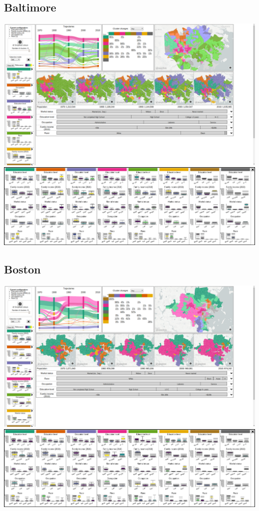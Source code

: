\documentclass[a4paper]{article}
\begin{document}
\subsection{Baltimore}
\begin{center}
	\includegraphics[width=\linewidth]{19a.png}
	\includegraphics[width=\linewidth]{19b.png}
\end{center} \clearpage



\subsection{Boston}
\begin{center}
	\includegraphics[width=\linewidth]{20a.png}
	\includegraphics[width=\linewidth]{20b.png}
\end{center} \clearpage
\end{document}
